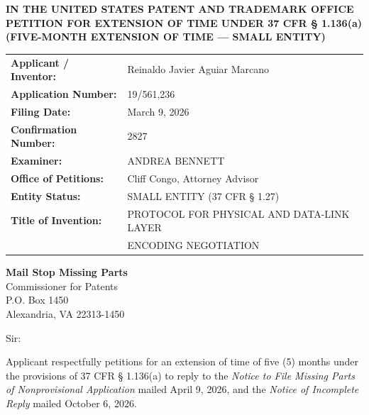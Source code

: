 \documentclass[11pt,letterpaper]{article}
\begin{document}
\thispagestyle{empty}

\begin{center}
    \textbf{\large IN THE UNITED STATES PATENT AND TRADEMARK OFFICE} \\
    \vspace{0.3cm}
    \textbf{\large PETITION FOR EXTENSION OF TIME UNDER 37 CFR \S{} 1.136(a)} \\
    \textbf{\normalsize (FIVE-MONTH EXTENSION OF TIME --- SMALL ENTITY)}
\end{center}

\vspace{0.4cm}
\noindent\begin{tabular}{p{2.3in}p{4.0in}}
\textbf{Applicant / Inventor:} & Reinaldo Javier Aguiar Marcano \\
\textbf{Application Number:} & 19/561,236 \\
\textbf{Filing Date:} & March 9, 2026 \\
\textbf{Confirmation Number:} & 2827 \\
\textbf{Examiner:} & ANDREA BENNETT \\
\textbf{Office of Petitions:} & Cliff Congo, Attorney Advisor \\
\textbf{Entity Status:} & SMALL ENTITY (37 CFR \S{} 1.27) \\
\textbf{Title of Invention:} & PROTOCOL FOR PHYSICAL AND DATA-LINK LAYER \\
& ENCODING NEGOTIATION \\
\end{tabular}

\vspace{0.5cm}
\noindent\textbf{Mail Stop Missing Parts} \\
Commissioner for Patents \\
P.O. Box 1450 \\
Alexandria, VA 22313-1450

\vspace{0.2cm}
Sir:

Applicant respectfully petitions for an extension of time of five (5) months under the provisions of 37 CFR \S{} 1.136(a) to reply to the \textit{Notice to File Missing Parts of Nonprovisional Application} mailed April 9, 2026, and the \textit{Notice of Incomplete Reply} mailed October 6, 2026.
\end{document}
